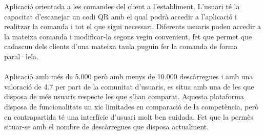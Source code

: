 Aplicació\cite{fastorder} orientada a les comandes del client a l'establiment. L'usuari té la capacitat d'escanejar un codi QR amb el qual podrà accedir a l'aplicació i realitzar la comanda i tot el que sigui necessari. Diferents usuaris poden accedir a la mateixa comanda i modificar-la segons vegin convenient, fet que permet que cadascun dels clients d'una mateixa taula puguin fer la comanda de forma paral·lela.
\\\\
Aplicació amb més de 5.000 però amb menys de 10.000 descàrregues i amb una valoració de 4.7 per part de la comunitat d'usuaris, es situa amb una de les que disposa de més usuaris respecte les que s'han comparat. Aquesta plataforma disposa de funcionalitats un xic limitades en comparació de la competència, però en contrapartida té una interfície d'usuari molt ben cuidada. Fet que la permès situar-se amb el nombre de descàrregues que disposa actualment.
\\
